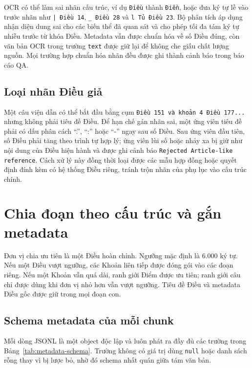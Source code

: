 \documentclass[12pt,a4paper]{article}
\newcommand{\code}[1]{\texttt{#1}}
\newcommand{\nullvalue}{\texttt{null}}
\begin{document}
OCR có thể làm sai nhãn cấu trúc, ví dụ \code{Điều} thành \code{Điền}, hoặc đưa
ký tự lề vào trước nhãn như \code{| Điều 14}, \code{\_ Điều 28} và
\code{l Tủ Điều 23}. Bộ phân tích áp dụng nhận diện dung sai cho các biến thể đã
quan sát và cho phép tối đa tám ký tự nhiễu trước từ khóa Điều. Metadata vẫn được
chuẩn hóa về số Điều đúng, còn văn bản OCR trong trường \code{text} được giữ lại
để không che giấu chất lượng nguồn. Mọi trường hợp chuẩn hóa nhãn đều được ghi
thành cảnh báo trong báo cáo QA.

\subsection{Loại nhãn Điều giả}

Một câu viện dẫn có thể bắt đầu bằng cụm \code{Điều 151 và khoản 4 Điều 177...}
nhưng không phải tiêu đề Điều. Để hạn chế gán nhãn sai, một ứng viên tiêu đề phải
có dấu phân cách ``.'', ``:'' hoặc ``-'' ngay sau số Điều. Sau ứng viên đầu tiên,
số Điều phải tăng theo trình tự hợp lý; ứng viên lùi số hoặc nhảy xa bị giữ như
nội dung của Điều hiện hành và được ghi cảnh báo \code{Rejected Article-like
reference}. Cách xử lý này đồng thời loại được các mẫu hợp đồng hoặc quyết định
đính kèm có hệ thống Điều riêng, tránh trộn nhãn của phụ lục vào cấu trúc chính.

\section{Chia đoạn theo cấu trúc và gắn metadata}

Đơn vị chia ưu tiên là một Điều hoàn chỉnh. Ngưỡng mặc định là 6.000 ký tự.
Nếu một Điều vượt ngưỡng, các Khoản liên tiếp được đóng gói vào các đoạn riêng.
Nếu một Khoản vẫn quá dài, ranh giới Điểm được ưu tiên; ranh giới câu chỉ được
dùng khi đơn vị nhỏ hơn vẫn vượt ngưỡng. Tiêu đề Điều và metadata Điều gốc được
giữ trong mọi đoạn con.

\subsection{Schema metadata của mỗi chunk}

Mỗi dòng JSONL là một object độc lập và luôn phát ra đầy đủ các trường trong
Bảng~\ref{tab:metadata-schema}. Trường không có giá trị dùng \nullvalue{} hoặc
danh sách rỗng thay vì bị lược bỏ, nhờ đó schema nhất quán giữa tám văn bản.
\end{document}
